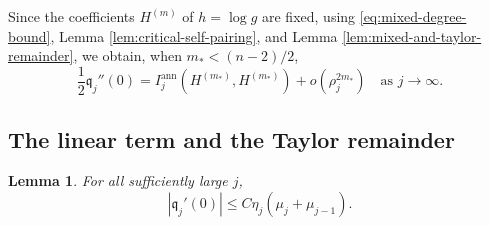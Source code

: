 \documentclass[11pt]{article}
\numberwithin{equation}{section}
\newtheorem{lemma}[theorem]{Lemma}
\theoremstyle{remark}
\begin{document}
Since the coefficients \(H^{(m)}\) of \(h=\log g\) are fixed,
{using \eqref{eq:mixed-degree-bound},
Lemma  \ref{lem:critical-self-pairing}, and
Lemma  \ref{lem:mixed-and-taylor-remainder}, we obtain, when
\(m_*<(n-2)/2\),}
\begin{equation}\label{eq:leading-quadratic-coefficient}
 \frac12\mathfrak q_j''(0)
 =I_j^{\mathrm{ann}}(H^{(m_*)},H^{(m_*)})+o(\rho_j^{2m_*})
 \quad\text{as }j\to\infty.
\end{equation}

\subsection{The linear term and the Taylor remainder}

\begin{lemma}\label{lem:reference-linear-term}
For all sufficiently large \(j\),
\[
 |\mathfrak q_j'(0)|
 \le C\eta_j(\mu_j+\mu_{j-1}).
\]
\end{lemma}
\end{document}
